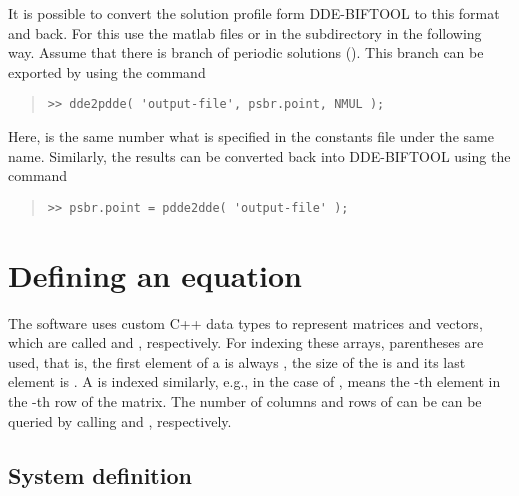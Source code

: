 \documentclass[10pt,a4paper]{ddedoc}
\begin{document}
It is possible to convert the solution profile form DDE-BIFTOOL to this format and back. For this use the matlab files  or  in the  subdirectory in the following way. Assume that there is branch of periodic solutions (). This branch can be exported by using the command
{ \small \begin{quote} \begin{lstlisting}[frame=single]
>> dde2pdde( 'output-file', psbr.point, NMUL );
\end{lstlisting} \end{quote} } \noindent
Here,  is the same number what is specified in the constants file under the same name.
Similarly, the results can be converted back into DDE-BIFTOOL using the command
{ \small \begin{quote} \begin{lstlisting}[frame=single]
>> psbr.point = pdde2dde( 'output-file' );
\end{lstlisting} \end{quote} } \noindent

\section{Defining an equation}

The software uses custom C++ data types to represent matrices and vectors,
which are called  and , respectively. For indexing
these arrays, parentheses are used, that is, the first element of a
  is always , the size of the  is  and its last
element is . A  is indexed similarly, e.g., in
the case of ,  means the -th element in the
-th row of the matrix. The number of columns and rows of  can be
can be queried by calling  and , respectively.

\subsection{System definition}\label{sysdef}
\end{document}
